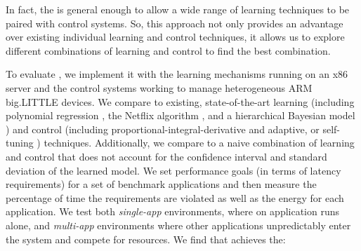 In fact, the \SYSTEM{} is general enough to allow a wide range of
learning techniques to be paired with control systems.  So, this
approach not only provides an advantage over existing individual
learning and control techniques, it allows us to explore different
combinations of learning and control to find the best combination.

To evaluate \SYSTEM{}, we implement it with the learning mechanisms
running on an x86 server and the control systems working to manage
heterogeneous ARM big.LITTLE devices.  We compare \SYSTEM{} to
existing, state-of-the-art learning (including polynomial regression
\cite{}, the Netflix algorithm \cite{}, and a hierarchical Bayesian
model \cite{}) and control (including proportional-integral-derivative
\cite{} and adaptive, or self-tuning \cite{}) techniques.
Additionally, we compare to a naive combination of learning and
control that does not account for the confidence interval and standard
deviation of the learned model.  We set performance goals (in terms of
latency requirements) for a set of benchmark applications and then
measure the percentage of time the requirements are violated as well
as the energy for each application.  We test both \emph{single-app}
environments, where on application runs alone, and \emph{multi-app}
environments where other applications unpredictably enter the system
and compete for resources.  We find that \SYSTEM{} achieves the:
